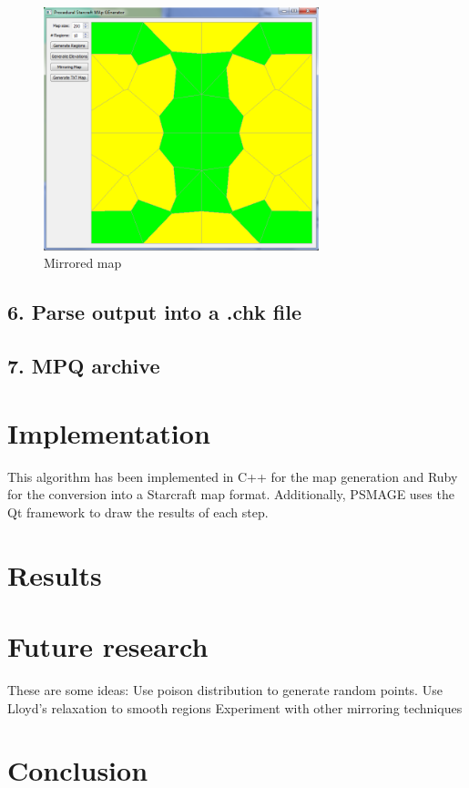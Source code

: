 \documentclass[letterpaper]{article}
\begin{document}
\begin{figure}[h]
    \centering
    \includegraphics[width=8cm]{PCG04.png}
    \caption{Mirrored map}
    \label{fig:mirrored-map}
\end{figure}

\subsection{6. Parse output into a .chk file}


\subsection{7. MPQ archive}




\section{Implementation} %
\label{sec:implementation}
This algorithm has been implemented in C++ for the map generation and Ruby for the conversion into a Starcraft map format. Additionally, PSMAGE uses the Qt framework to draw the results of each step.


\section{Results} %
\label{sec:results}



\section{Future research} %
\label{sec:future_research}
These are some ideas:
Use poison distribution to generate random points.
Use Lloyd's relaxation to smooth regions
Experiment with other mirroring techniques


\section{Conclusion} %
\label{sec:conclusion}





\end{document}
